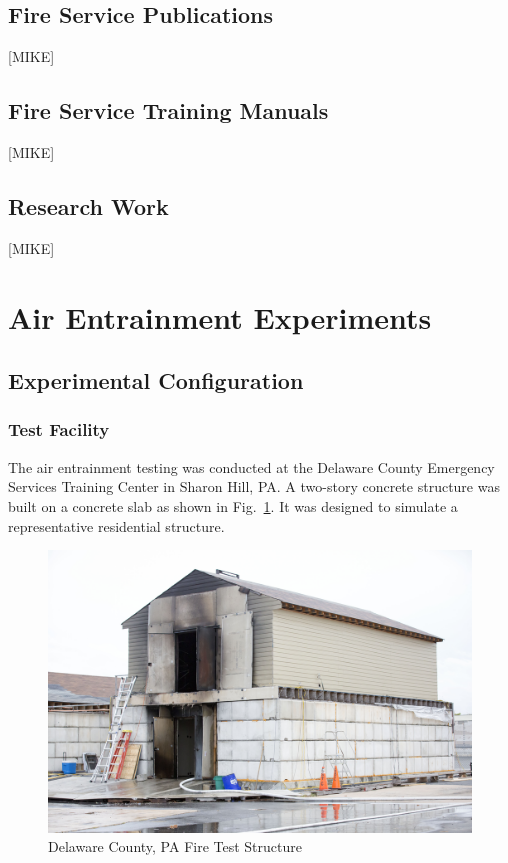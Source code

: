 \documentclass{article}
\begin{document}
\subsection{Fire Service Publications}

[MIKE]

\subsection{Fire Service Training Manuals}

[MIKE]

\subsection{Research Work}

[MIKE]

\clearpage

\section{Air Entrainment Experiments}

\subsection{Experimental Configuration}

\subsubsection{Test Facility}

The air entrainment testing was conducted at the Delaware County Emergency Services Training Center in Sharon Hill, PA. A two-story concrete structure was built on a concrete slab as shown in Fig.~\ref{fig:Delaware_County,_PA_Fire_Test_Structure}. It was designed to simulate a representative residential structure. 

\begin{figure}[!ht]
	\centering
	\includegraphics[width=\columnwidth]{Figures/Air_Entrainment/delcocorner.jpg}
	\caption{Delaware County, PA Fire Test Structure}
	\label{fig:Delaware_County,_PA_Fire_Test_Structure}
\end{figure}
\end{document}
